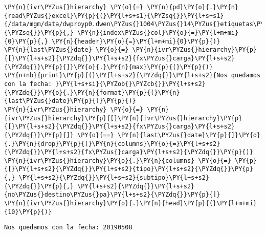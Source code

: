     \begin{tcolorbox}[breakable, size=fbox, boxrule=1pt, pad at break*=1mm,colback=cellbackground, colframe=cellborder]
\begin{Verbatim}[commandchars=\\\{\}]
\PY{n}{ivr\PYZus{}hierarchy} \PY{o}{=} \PY{n}{pd}\PY{o}{.}\PY{n}{read\PYZus{}excel}\PY{p}{(}\PY{l+s+s1}{\PYZsq{}}\PY{l+s+s1}{/data/mgm/data/dwproyp0.dwen\PYZus{}1004\PYZus{}14\PYZus{}etiquetas\PYZus{}23102019.xlsx}\PY{l+s+s1}{\PYZsq{}}\PY{p}{,} \PY{n}{index\PYZus{}col}\PY{o}{=}\PY{l+m+mi}{0}\PY{p}{,} \PY{n}{header}\PY{o}{=}\PY{l+m+mi}{0}\PY{p}{)}
\PY{n}{last\PYZus{}date} \PY{o}{=} \PY{n}{ivr\PYZus{}hierarchy}\PY{p}{[}\PY{l+s+s2}{\PYZdq{}}\PY{l+s+s2}{fx\PYZus{}carga}\PY{l+s+s2}{\PYZdq{}}\PY{p}{]}\PY{o}{.}\PY{n}{max}\PY{p}{(}\PY{p}{)}
\PY{n+nb}{print}\PY{p}{(}\PY{l+s+s2}{\PYZdq{}}\PY{l+s+s2}{Nos quedamos con la fecha: }\PY{l+s+si}{\PYZob{}\PYZcb{}}\PY{l+s+s2}{\PYZdq{}}\PY{o}{.}\PY{n}{format}\PY{p}{(}\PY{n}{last\PYZus{}date}\PY{p}{)}\PY{p}{)}
\PY{n}{ivr\PYZus{}hierarchy} \PY{o}{=} \PY{n}{ivr\PYZus{}hierarchy}\PY{p}{[}\PY{n}{ivr\PYZus{}hierarchy}\PY{p}{[}\PY{l+s+s2}{\PYZdq{}}\PY{l+s+s2}{fx\PYZus{}carga}\PY{l+s+s2}{\PYZdq{}}\PY{p}{]} \PY{o}{==} \PY{n}{last\PYZus{}date}\PY{p}{]}\PY{o}{.}\PY{n}{drop}\PY{p}{(}\PY{n}{columns}\PY{o}{=}\PY{l+s+s2}{\PYZdq{}}\PY{l+s+s2}{fx\PYZus{}carga}\PY{l+s+s2}{\PYZdq{}}\PY{p}{)}
\PY{n}{ivr\PYZus{}hierarchy}\PY{o}{.}\PY{n}{columns} \PY{o}{=} \PY{p}{[}\PY{l+s+s2}{\PYZdq{}}\PY{l+s+s2}{tipo}\PY{l+s+s2}{\PYZdq{}}\PY{p}{,} \PY{l+s+s2}{\PYZdq{}}\PY{l+s+s2}{subtipo}\PY{l+s+s2}{\PYZdq{}}\PY{p}{,} \PY{l+s+s2}{\PYZdq{}}\PY{l+s+s2}{no\PYZus{}destino\PYZus{}pa}\PY{l+s+s2}{\PYZdq{}}\PY{p}{]}
\PY{n}{ivr\PYZus{}hierarchy}\PY{o}{.}\PY{n}{head}\PY{p}{(}\PY{l+m+mi}{10}\PY{p}{)}
\end{Verbatim}
\end{tcolorbox}

    \begin{Verbatim}[commandchars=\\\{\}]
Nos quedamos con la fecha: 20190508
    \end{Verbatim}

